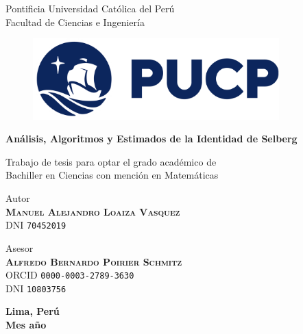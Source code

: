 \thispagestyle{empty}

\bigskip

\begin{center}
  {\baselineskip=30pt \Large Pontificia Universidad Cat\'olica del Per\'u} \\
  {\baselineskip=30pt \large Facultad de Ciencias e Ingenier\'ia}
\end{center}

\bigskip

\begin{figure}[H]
  \begin{center}
    \includegraphics[width=9.5cm]{images/2021-pucp-logo.png}
  \end{center}
\end{figure}

\begin{center}
  \begin{minipage}{14.0cm}
    \begin{center}
      \textcolor{pucp}
      {\textbf{\Huge{An\'alisis, Algoritmos y Estimados de la Identidad
      de Selberg}}}
    \end{center}
  \end{minipage}
\end{center}

\vspace*{2.00cm}

\begin{center}
  Trabajo de tesis para optar el grado acad\'emico de \\
  Bachiller en Ciencias con menci\'on en Matem\'aticas
\end{center}

\vspace*{2.00cm}

\begin{center}
  Autor \\
  \textbf{\textsc{Manuel Alejandro Loaiza Vasquez}} \\
  DNI \texttt{70452019}
\end{center}

\vspace*{0.5cm}

\begin{center}
  Asesor \\
  \textbf{\textsc{Alfredo Bernardo Poirier Schmitz}} \\
  ORCID \texttt{0000-0003-2789-3630} \\
  DNI \texttt{10803756}
\end{center}

\vspace*{1.00cm}

\begin{center}
  {
    \baselineskip=10pt
    \textbf{Lima, Per\'u} \\
    \textbf{Mes a\~no}
  }
\end{center}
